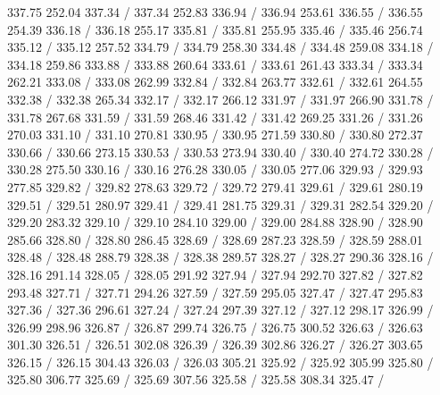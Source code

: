 { 337.75 252.04 337.34 /
 337.34 252.83 336.94 /
 336.94 253.61 336.55 /
 336.55 254.39 336.18 /
 336.18 255.17 335.81 /
 335.81 255.95 335.46 /
 335.46 256.74 335.12 /
 335.12 257.52 334.79 /
 334.79 258.30 334.48 /
 334.48 259.08 334.18 /
 334.18 259.86 333.88 /
 333.88 260.64 333.61 /
 333.61 261.43 333.34 /
 333.34 262.21 333.08 /
 333.08 262.99 332.84 /
 332.84 263.77 332.61 /
 332.61 264.55 332.38 /
 332.38 265.34 332.17 /
 332.17 266.12 331.97 /
 331.97 266.90 331.78 /
 331.78 267.68 331.59 /
 331.59 268.46 331.42 /
 331.42 269.25 331.26 /
 331.26 270.03 331.10 /
 331.10 270.81 330.95 /
 330.95 271.59 330.80 /
 330.80 272.37 330.66 /
 330.66 273.15 330.53 /
 330.53 273.94 330.40 /
 330.40 274.72 330.28 /
 330.28 275.50 330.16 /
 330.16 276.28 330.05 /
 330.05 277.06 329.93 /
 329.93 277.85 329.82 /
 329.82 278.63 329.72 /
 329.72 279.41 329.61 /
 329.61 280.19 329.51 /
 329.51 280.97 329.41 /
 329.41 281.75 329.31 /
 329.31 282.54 329.20 /
 329.20 283.32 329.10 /
 329.10 284.10 329.00 /
 329.00 284.88 328.90 /
 328.90 285.66 328.80 /
 328.80 286.45 328.69 /
 328.69 287.23 328.59 /
 328.59 288.01 328.48 /
 328.48 288.79 328.38 /
 328.38 289.57 328.27 /
 328.27 290.36 328.16 /
 328.16 291.14 328.05 /
 328.05 291.92 327.94 /
 327.94 292.70 327.82 /
 327.82 293.48 327.71 /
 327.71 294.26 327.59 /
 327.59 295.05 327.47 /
 327.47 295.83 327.36 /
 327.36 296.61 327.24 /
 327.24 297.39 327.12 /
 327.12 298.17 326.99 /
 326.99 298.96 326.87 /
 326.87 299.74 326.75 /
 326.75 300.52 326.63 /
 326.63 301.30 326.51 /
 326.51 302.08 326.39 /
 326.39 302.86 326.27 /
 326.27 303.65 326.15 /
 326.15 304.43 326.03 /
 326.03 305.21 325.92 /
 325.92 305.99 325.80 /
 325.80 306.77 325.69 /
 325.69 307.56 325.58 /
 325.58 308.34 325.47 /
}
